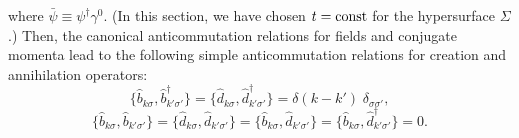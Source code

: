 \documentclass[12pt,nofootinbib,floatfix,aps,prd,showpacs,amsmath,amssymb,eqsecnum]{revtex4-2}
\begin{document}
where $\bar \psi \equiv \psi^\dagger \gamma^0$.
(In this section, we have chosen $t= {\rm const}$ for 
the hypersurface $\Sigma$.) Then, the  canonical 
anticommutation relations for fields and conjugate momenta 
lead to the following simple anticommutation relations for 
creation and annihilation operators:
\begin{equation}
\{\hat b_{k \sigma},\hat b^\dagger_{k' \sigma'}\}=
\{\hat d_{k \sigma},\hat d^\dagger_{k' \sigma'}\}=
\delta(k-k') \; \delta_{\sigma \sigma'},
\label{ACR}
\end{equation}
\begin{equation}
\{\hat b_{k \sigma},\hat b_{k' \sigma'}\}\!=\!
\{\hat d_{k \sigma},\hat d_{k' \sigma'}\}\!=\!
\{\hat b_{k \sigma},\hat d_{k' \sigma'}\}\!=\!
\{\hat b_{k \sigma},\hat d^\dagger_{k' \sigma'}\}\!=\!
0.
\end{equation}
\end{document}
